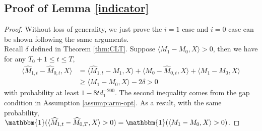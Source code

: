 \documentclass[12pt]{article}
\newcommand{\inp}[2]{\langle #1,#2\rangle}
\theoremstyle{plain}
\begin{document}
\subsection{Proof of Lemma \ref{indicator}}
\begin{proof}
    Without loss of generality, we just prove the $i=1$ case and $i=0$ case can be shown following the same arguments. \\
    Recall $\delta$ defined in Theorem \ref{thm:CLT}. Suppose $\inp{M_1-M_0}{X}>0$, then we have for any $T_0+1\leq t\leq T$,
    \begin{align*}
       \inp{\widehat{M}_{1,t}-\widehat{M}_{0,t}}{X}&=\inp{\widehat{M}_{1,t} - M_1}{X} + \inp{M_0-\widehat{M}_{0,t}}{X} + \inp{M_1-M_0}{X} \\
       &\geq \inp{M_1-M_0}{X} - 2\delta > 0
    \end{align*}
    with probability at least $1-8td_1^{-200}$. The second inequality comes from the gap condition in Assumption \ref{assump:arm-opt}. As a result, with the same probability, $\mathbbm{1}(\inp{\widehat{M}_{1,t}-\widehat{M}_{0,T}}{X}>0)=\mathbbm{1}(\inp{M_1-M_0}{X}>0)$.
\end{proof}
\end{document}
